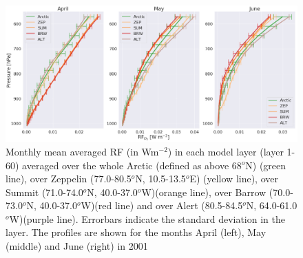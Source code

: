\begin{figure}[ht]
    \centering
    \includegraphics[width = \linewidth]{Chapter6_Results/images/RF/vert_RF_AprJune_2001.png}
    \caption{Monthly mean averaged RF (in Wm$^{-2}$) in each model layer (layer 1-60) averaged over the whole Arctic (defined as above 68$^o$N) (green line), over Zeppelin (77.0-80.5$^o$N, 10.5-13.5$^o$E) (yellow line), over Summit (71.0-74.0$^o$N, 40.0-37.0$^o$W)(orange line), over Barrow (70.0-73.0$^o$N, 40.0-37.0$^o$W)(red line) and over Alert (80.5-84.5$^o$N, 64.0-61.0$^o$W)(purple line). Errorbars indicate the standard deviation in the layer. The profiles are shown for the months April (left), May (middle) and June (right) in 2001}
    \label{fig:vert_RF_AprJune_2001}
\end{figure}


